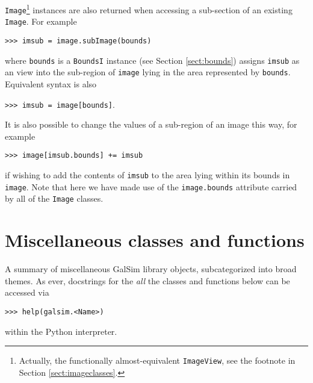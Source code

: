 \documentclass[preprint,11pt]{aastex}
\begin{document}
\texttt{Image}\footnote{Actually, the functionally almost-equivalent
  \texttt{ImageView}, see the footnote in Section
  \ref{sect:imageclasses}.}  instances are also returned when
accessing a sub-section of an existing \texttt{Image}.  For example

{\tt >>> imsub = image.subImage(bounds)}

where \texttt{bounds} is a \texttt{BoundsI} instance (see Section
\ref{sect:bounds}) assigns \texttt{imsub} as an view into
the sub-region of \texttt{image} lying in the area represented by
\texttt{bounds}.  Equivalent syntax is also

{\tt >>> imsub = image[bounds]}.

It is also possible to change the values of a sub-region of an image
this way, for example

{\tt >>> image[imsub.bounds] += imsub}

if wishing to add the contents of \texttt{imsub} to the area lying
within its bounds in \texttt{image}.  Note that here we have made use of
the \texttt{image.bounds} attribute carried by all of the \texttt{Image}
classes.

\section{Miscellaneous classes and functions}\label{sect:misc}

A summary of miscellaneous GalSim library objects, subcategorized into
broad themes.  As ever, docstrings for the \emph{all} the classes and
functions below can be accessed via

{\tt >>> help(galsim.<Name>)}

within the Python interpreter.
\end{document}
